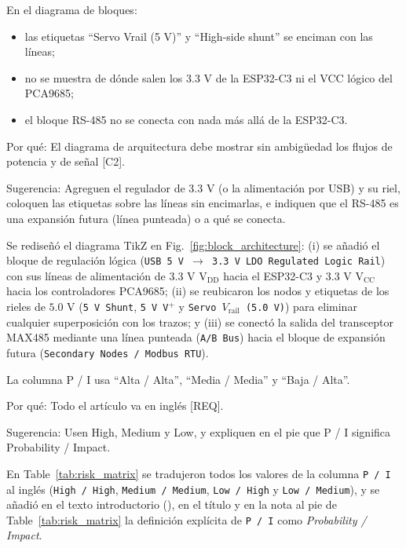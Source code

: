 \documentclass{LabDSTresponse}
\begin{document}
{En el diagrama de bloques:
\begin{itemize}
    \item las etiquetas “Servo Vrail (5 V)” y “High-side shunt” se enciman con las líneas;
    \item no se muestra de dónde salen los 3.3 V de la ESP32-C3 ni el VCC lógico del PCA9685;
    \item el bloque RS-485 no se conecta con nada más allá de la ESP32-C3.
\end{itemize}

Por qué: El diagrama de arquitectura debe mostrar sin ambigüedad los flujos de potencia y de señal [C2].

Sugerencia: Agreguen el regulador de 3.3 V (o la alimentación por USB) y su riel, coloquen las etiquetas sobre las líneas sin encimarlas, e indiquen que el RS-485 es una expansión futura (línea punteada) o a qué se conecta.}
{Se rediseñó el diagrama TikZ en Fig.~\ref{fig:block_architecture}: (i) se añadió el bloque de regulación lógica (\texttt{USB 5 V $\to$ 3.3 V LDO Regulated Logic Rail}) con sus líneas de alimentación de $3.3\text{ V }\text{V}_{\text{DD}}$ hacia el ESP32-C3 y $3.3\text{ V }\text{V}_{\text{CC}}$ hacia los controladores PCA9685; (ii) se reubicaron los nodos y etiquetas de los rieles de $5.0\text{ V}$ (\texttt{5 V Shunt}, \texttt{5 V V$^+$} y \texttt{Servo $V_{\text{rail}}$ (5.0 V)}) para eliminar cualquier superposición con los trazos; y (iii) se conectó la salida del transceptor MAX485 mediante una línea punteada (\texttt{A/B Bus}) hacia el bloque de expansión futura (\texttt{Secondary Nodes / Modbus RTU}).}

{La columna P / I usa “Alta / Alta”, “Media / Media” y “Baja / Alta”.

Por qué: Todo el artículo va en inglés [REQ].

Sugerencia: Usen High, Medium y Low, y expliquen en el pie que P / I significa Probability / Impact.}
{En Table~\ref{tab:risk_matrix} se tradujeron todos los valores de la columna \texttt{P / I} al inglés (\texttt{High / High}, \texttt{Medium / Medium}, \texttt{Low / High} y \texttt{Low / Medium}), y se añadió en el texto introductorio (), en el título y en la nota al pie de Table~\ref{tab:risk_matrix} la definición explícita de \texttt{P / I} como \textit{Probability / Impact}.}

\end{document}
